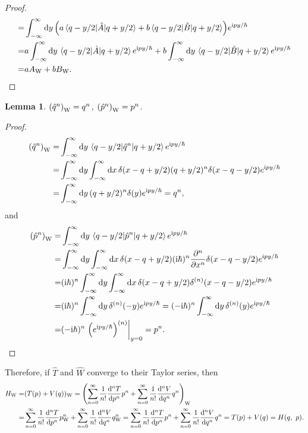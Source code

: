 \documentclass{article}
\newtheorem{lemma}[theorem]{Lemma}
\newcommand{\iu}{\ensuremath{\mathrm{i}}}
\begin{document}
\begin{enumerate}[1.]
\begin{enumerate}[(i)]
\begin{proof}
\begin{align*}
        =& \int_{-\infty}^{\infty}\dd{y}\qty(a\mel{q-y/2}{\hat{A}}{q + y/2} + b\mel{q-y/2}{\hat{B}}{q + y/2})e^{\iu p y / \hbar}\\
        =& a\int_{-\infty}^{\infty}\dd{y}\mel{q-y/2}{\hat{A}}{q + y/2} e^{\iu p y / \hbar} + b\int_{-\infty}^{\infty}\dd{y}\mel{q-y/2}{\hat{B}}{q + y/2} e^{\iu p y / \hbar} \\
        =& aA_\mathrm{W} + bB_\mathrm{W}.
      \end{align*}
    \end{proof}
    \begin{lemma}
      $\qty(\hat{q}^n)_\mathrm{W} = q^n$, $\qty(\hat{p}^n)_\mathrm{W} = p^n$.
    \end{lemma}
    \begin{proof}
      \begin{align*}
        \qty(\hat{q}^n)_\mathrm{W}  =& \int_{-\infty}^{\infty}\dd{y}\mel{q-y/2}{\hat{q}^n}{q + y/2} e^{\iu p y / \hbar}
        \\
        =& \int_{-\infty}^{\infty}\dd{y} \int_{-\infty}^{\infty} \dd{x} \delta(x - q + y/2) (q+y/2)^n \delta(x - q - y/2) e^{\iu p y / \hbar} \\
        =& \int_{-\infty}^{\infty}\dd{y} (q+y/2)^n\delta(y) e^{\iu p y / \hbar}
        = q^n,
      \end{align*}
      and
      \begin{align*}
        \qty(\hat{p}^n)_\mathrm{W} =& \int_{-\infty}^{\infty}\dd{y}\mel{q-y/2}{\hat{p}^n}{q + y/2} e^{\iu p y / \hbar}
        \\
        =& \int_{-\infty}^{\infty}\dd{y} \int_{-\infty}^{\infty} \dd{x} \delta(x - q + y/2) (\iu\hbar)^n\pdv[n]{x} \delta(x - q - y/2) e^{\iu p y / \hbar} \\
        =& (\iu\hbar)^n\int_{-\infty}^{\infty}\dd{y} \int_{-\infty}^{\infty} \dd{x} \delta(x - q + y/2) \delta^{(n)}(x - q - y/2) e^{\iu p y / \hbar}\\
        =& (\iu\hbar)^n\int_{-\infty}^{\infty}\dd{y}\delta^{(n)}(- y)  e^{\iu p y / \hbar} 
        = (-\iu\hbar)^n\int_{-\infty}^{\infty}\dd{y}\delta^{(n)}(y)  e^{\iu p y / \hbar} \\
        =& (-\iu\hbar)^n\eval{\qty(e^{\iu p y / \hbar})^{(n)}}_{y = 0} = p^n.
      \end{align*}
    \end{proof}
    Therefore, if $\hat{T}$ and $\hat{W}$ converge to their Taylor series, then
    \begin{align*}
      H_\mathrm{W} =& (T(p) + V(q))_\mathrm{W} = \qty(\sum_{n=0}^{\infty} \frac{1}{n!}\dv[n]{T}{p}p^n + \sum_{n=0}^{\infty} \frac{1}{n!}\dv[n]{V}{q}q^n)_\mathrm{W}\\
      =& \sum_{n=0}^{\infty} \frac{1}{n!}\dv[n]{T}{p}p_\mathrm{W}^n + \sum_{n=0}^{\infty} \frac{1}{n!}\dv[n]{V}{q}q_\mathrm{W}^n
      =\sum_{n=0}^{\infty} \frac{1}{n!}\dv[n]{T}{p}p^n + \sum_{n=0}^{\infty} \frac{1}{n!}\dv[n]{V}{q}q^n
      =T(p)+ V(q) = H(q,\ p).
    \end{align*}


\end{enumerate}
\end{enumerate}
\end{document}

